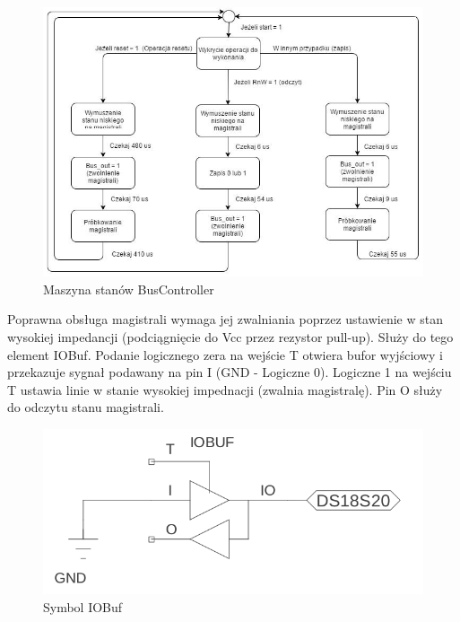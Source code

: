\documentclass[a4paper]{article}
\begin{document}
\begin{figure}[H]
\begin{center}
\includegraphics[width=15cm]{graphics/bus_controller_fsm.png}
\end{center}
\caption{Maszyna stanów BusController}
\label{bus_controller_fsm}
\end{figure}

Poprawna obsługa magistrali wymaga jej zwalniania poprzez ustawienie w stan wysokiej impedancji (podciągnięcie do Vcc przez rezystor pull-up). Służy do tego element IOBuf. Podanie logicznego zera na wejście T otwiera bufor wyjściowy i przekazuje sygnał podawany na pin I (GND - Logiczne 0). Logiczne 1 na wejściu T ustawia linie w stanie wysokiej impednacji (zwalnia magistralę). Pin O służy do odczytu stanu magistrali.

\begin{figure}[H]
\begin{center}
\includegraphics[scale=1.4]{graphics/io_buf_sym.png}
\end{center}
\caption{Symbol IOBuf}
\label{iobuf_controller_sym}
\end{figure}
\end{document}
